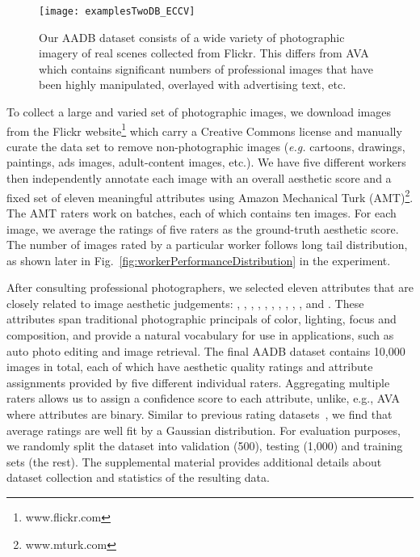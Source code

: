 \documentclass[runningheads]{llncs}
\def\eg{\emph{e.g. }}
\begin{document}
\begin{figure}[t]
\centering
\texttt{[image: examplesTwoDB\_ECCV]}
\vspace*{-1mm}
   \caption{Our AADB dataset consists of a wide variety of photographic imagery
   of real scenes collected from Flickr. This differs from AVA which contains
   significant numbers of professional images that have been highly
   manipulated, overlayed with advertising text, etc.}
\label{fig:examplesTwoDB}
\vspace{-1mm}
\end{figure}

To collect a large and varied set of photographic images, we download images
from the Flickr website\footnote{www.flickr.com}
which carry a Creative Commons
license and manually curate the data set to remove non-photographic images
(\eg cartoons, drawings, paintings, ads images, adult-content images, etc.).
We have five different workers then independently annotate each image with an overall
aesthetic score and a fixed set of eleven meaningful attributes using Amazon
Mechanical Turk (AMT)\footnote{www.mturk.com}.
The AMT raters work on batches,
each of which contains ten images.
For each image,
we average the ratings of five raters as the ground-truth aesthetic score.
The number of images rated by a
particular worker follows long tail distribution,
as shown later in Fig.~\ref{fig:workerPerformanceDistribution} in the experiment.


After consulting professional photographers, we selected eleven attributes that
are closely related to image aesthetic judgements: , ,
, , , ,
, , , , and .
These attributes span traditional photographic principals of color, lighting,
focus and composition, and provide a natural vocabulary for use in applications,
such as auto photo editing and image retrieval.  The final AADB dataset
contains  10,000 images in total, each of which have aesthetic quality
ratings and attribute assignments provided by five different individual raters.
Aggregating multiple raters allows us to assign a confidence score to each
attribute, unlike, e.g., AVA where attributes are binary.  Similar to previous
rating datasets~\cite{murray2012ava}, we find that average ratings are well fit
by a Gaussian distribution.  For evaluation purposes, we randomly split the
dataset into validation (500), testing (1,000) and training sets (the rest).
The supplemental material provides additional details about dataset collection
and statistics of the resulting data.
\end{document}
